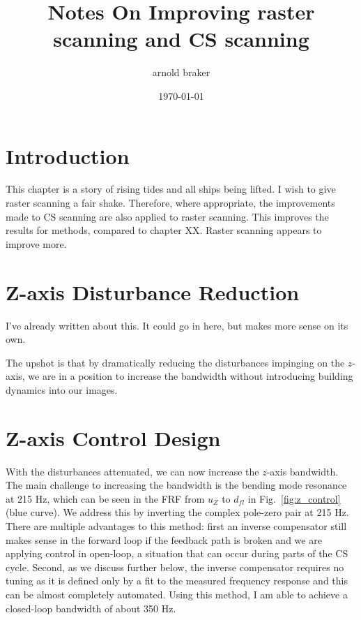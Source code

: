\documentclass[11pt]{article}
\author{arnold braker}
\date{\today}
\title{Notes On Improving raster scanning and CS scanning}
\begin{document}
\maketitle
\tableofcontents

\section{Introduction}
This chapter is a story of rising tides and all ships being lifted. I wish to give raster scanning a fair shake. Therefore, where appropriate, the improvements made to CS scanning are also applied to raster scanning. This improves the results for methods, compared to chapter XX. Raster scanning appears to improve more.

\section{Z-axis Disturbance Reduction}
I've already written about this. It could go in here, but makes more sense on its own. 

The upshot is that by dramatically reducing the disturbances impinging on the $z$-axis, we are in a position to increase the bandwidth without introducing building dynamics into our images.

\section{Z-axis Control Design}
With the disturbances attenuated, we can now increase the $z$-axis bandwidth. The main challenge to increasing the bandwidth is the bending mode resonance at 215 Hz, which can be seen in the FRF from $u_Z$ to $d_{fl}$ in Fig.~\ref{fig:z_control} (blue curve). We address this by inverting the complex pole-zero pair at 215 Hz. There are multiple advantages to this method: first an inverse compensator still makes sense in the forward loop if the feedback path is broken and we are applying control in open-loop, a situation that can occur during parts of the CS cycle. Second, as we discuss further below, the inverse compensator requires no tuning as it is defined only by a fit to the measured frequency response and this can be almost completely automated. Using this method, I am able to achieve a closed-loop bandwidth of about 350 Hz.
\end{document}
